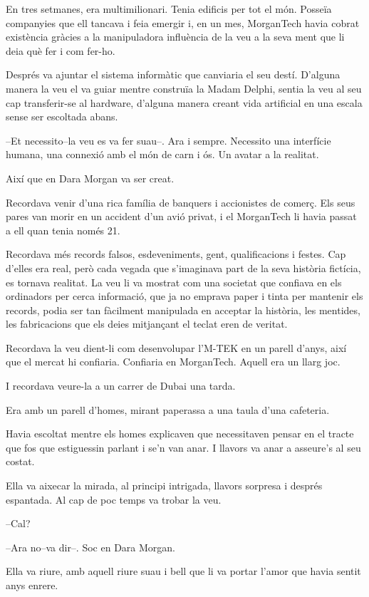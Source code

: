 En tres setmanes, era multimilionari. Tenia edificis per tot el món.
Posseïa companyies que ell tancava i feia emergir i, en un mes,
MorganTech havia cobrat existència gràcies a la manipuladora influència
de la veu a la seva ment que li deia què fer i com fer-ho.

Després va ajuntar el sistema informàtic que canviaria el seu destí.
D'alguna manera la veu el va guiar mentre construïa la Madam Delphi,
sentia la veu al seu cap transferir-se al hardware, d'alguna manera
creant vida artificial en una escala sense ser escoltada abans.

--Et necessito--la veu es va fer suau--. Ara i sempre. Necessito una
interfície humana, una connexió amb el món de carn i ós. Un avatar a la
realitat.

Així que en Dara Morgan va ser creat.

Recordava venir d'una rica família de banquers i accionistes de comerç.
Els seus pares van morir en un accident d'un avió privat, i el
MorganTech li havia passat a ell quan tenia només 21.

Recordava més records falsos, esdeveniments, gent, qualificacions i
festes. Cap d'elles era real, però cada vegada que s'imaginava part de
la seva història fictícia, es tornava realitat. La veu li va mostrat com
una societat que confiava en els ordinadors per cerca informació, que ja
no emprava paper i tinta per mantenir els records, podia ser tan
fàcilment manipulada en acceptar la història, les mentides, les
fabricacions que els deies mitjançant el teclat eren de veritat.

Recordava la veu dient-li com desenvolupar l'M-TEK en un parell d'anys,
així que el mercat hi confiaria. Confiaria en MorganTech. Aquell era un
llarg joc.

I recordava veure-la a un carrer de Dubai una tarda.

Era amb un parell d'homes, mirant paperassa a una taula d'una cafeteria.

Havia escoltat mentre els homes explicaven que necessitaven pensar en el
tracte que fos que estiguessin parlant i se'n van anar. I llavors va
anar a asseure's al seu costat.

Ella va aixecar la mirada, al principi intrigada, llavors sorpresa i
després espantada. Al cap de poc temps va trobar la veu.

--Cal?

--Ara no--va dir--. Soc en Dara Morgan.

Ella va riure, amb aquell riure suau i bell que li va portar l'amor que
havia sentit anys enrere.

